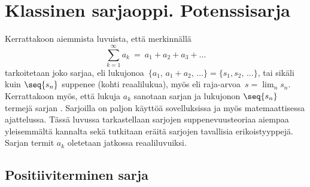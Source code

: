 \section{Klassinen sarjaoppi. Potenssisarja} \label{potenssisarja}
\alku
{}

Kerrattakoon aiemmista luvuista, että merkinnällä
\[
\sum_{k=1}^\infty a_k\ =\ a_1 + a_2 + a_3 + \ldots
\]
tarkoitetaan joko sarjaa, eli lukujonoa 
$\,\{a_1,\,a_1 + a_2,\,\ldots\} = \{s_1,s_2,\,\ldots\}$, tai sikäli kuin $\seq{s_n}$ suppenee
(kohti reaalilukua), myös  eli raja-arvoa $\,s = \lim_n s_n$. Kerrattakoon
myös, että lukuja $a_k$ sanotaan sarjan  ja lukujonon $\seq{s_n}$ termejä sarjan
. Sarjoilla on paljon käyttöä sovelluksissa ja myös matemaattisessa
ajattelussa. Tässä luvussa tarkastellaan sarjojen suppenevuusteoriaa aiempaa yleisemmältä
kannalta sekä tutkitaan eräitä sarjojen tavallisia erikoistyyppejä. Sarjan termit $a_k$
oletetaan jatkossa reaaliluvuiksi.

\subsection*{Positiiviterminen sarja}
%

